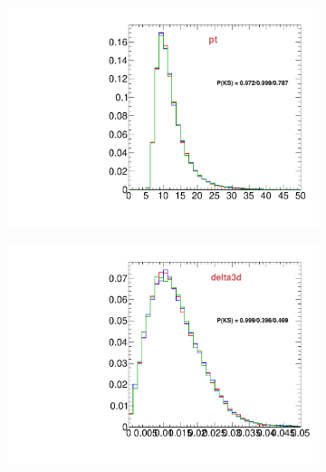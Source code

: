 \begin{figure}
\begin{subfigure}[b]{0.2\textwidth}
                \includegraphics[width=\textwidth]{Figures/VariablesComparison/Data_endcaps_figs_3h/pt}
                \label{fig:Data_endcaps_pt_3h}
        \end{subfigure}
        \begin{subfigure}[b]{0.2\textwidth}
                \centering
                \includegraphics[width=\textwidth]{Figures/VariablesComparison/Data_endcaps_figs_3h/delta3d}
                \label{fig:Data_endcaps_delta3d_3h}
        \end{subfigure}
        \begin{subfigure}[b]{0.2\textwidth}
                \centering

\end{subfigure}
\end{figure}
